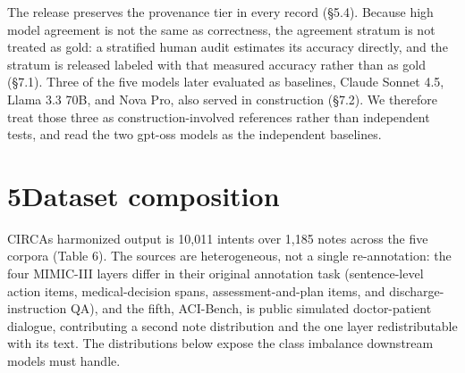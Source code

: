 The release preserves the provenance tier in every record (§5.4). Because high model agreement is not the same as correctness, the agreement stratum is not treated as gold: a stratified human audit estimates its accuracy directly, and the stratum is released labeled with that measured accuracy rather than as gold (§7.1). Three of the five models later evaluated as baselines, Claude Sonnet 4.5, Llama 3.3 70B, and Nova Pro, also served in construction (§7.2). We therefore treat those three as construction-involved references rather than independent tests, and read the two gpt-oss models as the independent baselines.

\section{\texorpdfstring{{5}Dataset composition}{5Dataset composition}}\label{dataset-composition}

CIRCA\textquotesingle s harmonized output is 10,011 intents over 1,185 notes across the five corpora (Table 6). The sources are heterogeneous, not a single re-annotation: the four MIMIC-III layers differ in their original annotation task (sentence-level action items, medical-decision spans, assessment-and-plan items, and discharge-instruction QA), and the fifth, ACI-Bench, is public simulated doctor-patient dialogue, contributing a second note distribution and the one layer redistributable with its text. The distributions below expose the class imbalance downstream models must handle.

